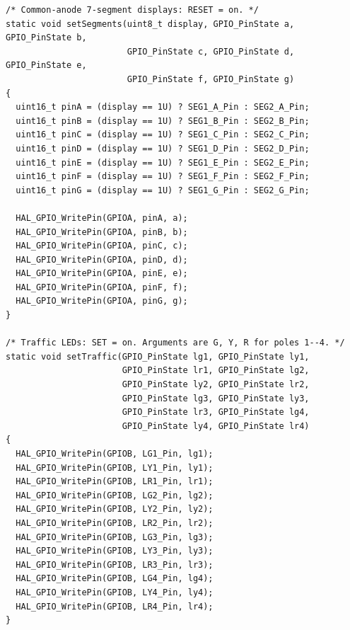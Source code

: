 \begin{lstlisting}[basicstyle=\ttfamily\small,caption={Exercise 5: selecting a display and controlling each traffic LED}]
/* Common-anode 7-segment displays: RESET = on. */
static void setSegments(uint8_t display, GPIO_PinState a, GPIO_PinState b,
                        GPIO_PinState c, GPIO_PinState d, GPIO_PinState e,
                        GPIO_PinState f, GPIO_PinState g)
{
  uint16_t pinA = (display == 1U) ? SEG1_A_Pin : SEG2_A_Pin;
  uint16_t pinB = (display == 1U) ? SEG1_B_Pin : SEG2_B_Pin;
  uint16_t pinC = (display == 1U) ? SEG1_C_Pin : SEG2_C_Pin;
  uint16_t pinD = (display == 1U) ? SEG1_D_Pin : SEG2_D_Pin;
  uint16_t pinE = (display == 1U) ? SEG1_E_Pin : SEG2_E_Pin;
  uint16_t pinF = (display == 1U) ? SEG1_F_Pin : SEG2_F_Pin;
  uint16_t pinG = (display == 1U) ? SEG1_G_Pin : SEG2_G_Pin;

  HAL_GPIO_WritePin(GPIOA, pinA, a);
  HAL_GPIO_WritePin(GPIOA, pinB, b);
  HAL_GPIO_WritePin(GPIOA, pinC, c);
  HAL_GPIO_WritePin(GPIOA, pinD, d);
  HAL_GPIO_WritePin(GPIOA, pinE, e);
  HAL_GPIO_WritePin(GPIOA, pinF, f);
  HAL_GPIO_WritePin(GPIOA, pinG, g);
}

/* Traffic LEDs: SET = on. Arguments are G, Y, R for poles 1--4. */
static void setTraffic(GPIO_PinState lg1, GPIO_PinState ly1,
                       GPIO_PinState lr1, GPIO_PinState lg2,
                       GPIO_PinState ly2, GPIO_PinState lr2,
                       GPIO_PinState lg3, GPIO_PinState ly3,
                       GPIO_PinState lr3, GPIO_PinState lg4,
                       GPIO_PinState ly4, GPIO_PinState lr4)
{
  HAL_GPIO_WritePin(GPIOB, LG1_Pin, lg1);
  HAL_GPIO_WritePin(GPIOB, LY1_Pin, ly1);
  HAL_GPIO_WritePin(GPIOB, LR1_Pin, lr1);
  HAL_GPIO_WritePin(GPIOB, LG2_Pin, lg2);
  HAL_GPIO_WritePin(GPIOB, LY2_Pin, ly2);
  HAL_GPIO_WritePin(GPIOB, LR2_Pin, lr2);
  HAL_GPIO_WritePin(GPIOB, LG3_Pin, lg3);
  HAL_GPIO_WritePin(GPIOB, LY3_Pin, ly3);
  HAL_GPIO_WritePin(GPIOB, LR3_Pin, lr3);
  HAL_GPIO_WritePin(GPIOB, LG4_Pin, lg4);
  HAL_GPIO_WritePin(GPIOB, LY4_Pin, ly4);
  HAL_GPIO_WritePin(GPIOB, LR4_Pin, lr4);
}
\end{lstlisting}

